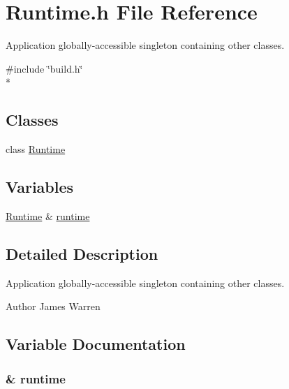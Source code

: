 \section{Runtime.\-h File Reference}
\label{_runtime_8h}


Application globally-\/accessible singleton containing other classes.  


{\ttfamily \#include \char`\"{}build.\-h\char`\"{}}\\*
\subsection*{Classes}
\begin{DoxyCompactItemize}
\item 
class \hyperlink{class_runtime}{Runtime}
\end{DoxyCompactItemize}
\subsection*{Variables}
\begin{DoxyCompactItemize}
\item 
\hyperlink{class_runtime}{Runtime} \& \hyperlink{_runtime_8h_af1705ecc1d279440da4c3de49513a725}{runtime}
\end{DoxyCompactItemize}


\subsection{Detailed Description}
Application globally-\/accessible singleton containing other classes. \begin{DoxyAuthor}{Author}
James Warren 
\end{DoxyAuthor}


\subsection{Variable Documentation}
\subsubsection[{runtime}]{\& runtime}\label{_runtime_8h_af1705ecc1d279440da4c3de49513a725}
